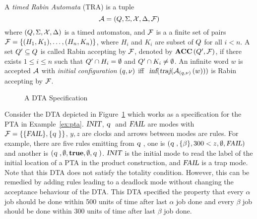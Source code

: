\begin{definition}
A \emph{timed Rabin Automata} (TRA) is a tuple 
\begin{equation}\label{eq:tra}
    \mathcal{A}=(Q,\Sigma,\mathcal{X},\Delta,\mathcal{F})
\end{equation}
where $(Q,\Sigma,\mathcal{X},\Delta)$ is a timed automaton, and $\mathcal{F}$ is a a finite 
set of pairs
$
    \mathcal{F} 
        = \{ 
            (H_1,K_1 ), 
            \dots, 
            (H_n,K_n) 
        \} 
$,
where $H_i$ and $K_i$ are subset of $Q$ for all $i<n$.
A set $Q' \subseteq Q $ is called Rabin accepting by $\mathcal{F}$, 
denoted by $\mbox{\bf ACC} \left( {Q'}, {\mathcal{F}} \right)$,
if there exists $ 1 \leq i \leq n$ such that $ Q' \cap H_i= \emptyset $ 
and $ Q' \cap K_i \neq \emptyset $. An infinite word $w$ is accepted  
$\mathcal{A}$ with \emph{initial configuration} $(q,\nu)$ iff    
$
    \mbox{  }
    \mbox{\sl inf} (  
        \mbox{\sl traj} (  
            {\mathcal{A}}_{(q,\nu)}\left(w\right) 
         )
     )
$ is Rabin accepting by $\mathcal{F}$.
\end{definition}

\begin{figure}
    \centering
    \resizebox{.5\textwidth}{!}{
        
        }
    \caption{A DTA Specification}
    \label{fig:dta}  
\end{figure}

\begin{example}\label{ex:dta}
Consider the DTA depicted in Figure~\ref{fig:dta} which works as a specification for the PTA in Example~\ref{ex:pta}.
$\mbox{\sl INIT}$, $\mbox{\sl q }$ and $\mbox{\sl FAIL}$ are modes with $\mathcal{F} = \{ \{ \mbox{\sl FAIL} \}, \{ \mbox{\sl q } \} \}$, $y,z$ are clocks and arrows between modes are rules.
For example, there are five rules emitting from $\mbox{\sl q }$, one is 
$(\mbox{\sl q }, \{\beta\}, 300 < z, \emptyset, \mbox{\sl FAIL})$ and another is 
$(\mbox{\sl q }, \emptyset, \mathbf{true},\emptyset, \mbox{\sl q })$.
$\mbox{\sl INIT}$ is the initial mode to read the label of the initial location of a PTA in the product construction, and $\mbox{\sl FAIL}$ is a trap mode.
Note that this DTA does not satisfy the totality condition. However, this can be remedied by adding rules leading to a deadlock mode without changing the acceptance behaviour of the DTA.
This DTA specified the property that every $\alpha$ job should be done within 500 units 
of time after last $\alpha$ job done and every $\beta$ job should be done within 
300 units of time after last $\beta$ job done. 
\end{example}

